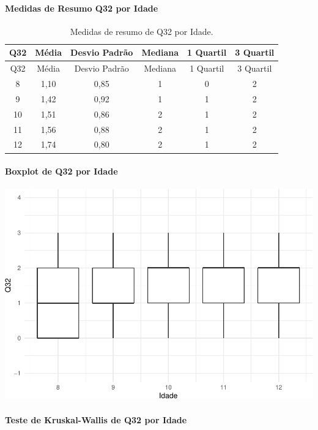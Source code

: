 \documentclass[]{article}
\let\oldparagraph\paragraph
\renewcommand{\paragraph}[1]{\oldparagraph{#1}\mbox{}}
\begin{document}
\cleardoublepage

\hypertarget{medidas-de-resumo-q32-por-idade}{%
\paragraph{Medidas de Resumo Q32 por Idade}\label{medidas-de-resumo-q32-por-idade}}

\begin{longtable}[]{@{}cccccc@{}}
\caption{\label{tab:unnamed-chunk-1098}Medidas de resumo de Q32 por Idade.}\tabularnewline
\toprule
Q32 & Média & Desvio Padrão & Mediana & 1 Quartil & 3 Quartil\tabularnewline
\midrule
\endfirsthead
\toprule
Q32 & Média & Desvio Padrão & Mediana & 1 Quartil & 3 Quartil\tabularnewline
\midrule
\endhead
8 & 1,10 & 0,85 & 1 & 0 & 2\tabularnewline
9 & 1,42 & 0,92 & 1 & 1 & 2\tabularnewline
10 & 1,51 & 0,86 & 2 & 1 & 2\tabularnewline
11 & 1,56 & 0,88 & 2 & 1 & 2\tabularnewline
12 & 1,74 & 0,80 & 2 & 1 & 2\tabularnewline
\bottomrule
\end{longtable}

\hypertarget{boxplot-de-q32-por-idade}{%
\paragraph{Boxplot de Q32 por Idade}\label{boxplot-de-q32-por-idade}}

\begin{center}\includegraphics[width=0.75\linewidth]{relatorio_covid19_files/figure-latex/unnamed-chunk-1099-1} \end{center}

\hypertarget{teste-de-kruskal-wallis-de-q32-por-idade}{%
\paragraph{Teste de Kruskal-Wallis de Q32 por Idade}\label{teste-de-kruskal-wallis-de-q32-por-idade}}
\end{document}
